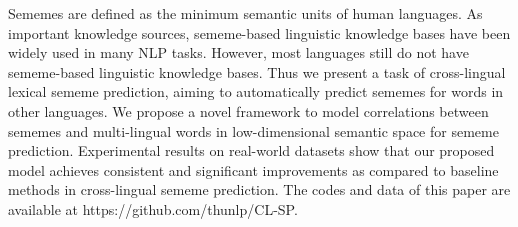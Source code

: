 Sememes are defined as the minimum semantic units of human languages. As important knowledge sources, sememe-based linguistic knowledge bases have been widely used in many NLP tasks. However, most languages still do not have sememe-based linguistic knowledge bases. Thus we present a task of cross-lingual lexical sememe prediction, aiming to automatically predict sememes for words in other languages. We propose a novel framework to model correlations between sememes and multi-lingual words in low-dimensional semantic space for sememe prediction. Experimental results on real-world datasets show that our proposed model achieves consistent and significant improvements as compared to baseline methods in cross-lingual sememe prediction. The codes and data of this paper are available at https://github.com/thunlp/CL-SP.

